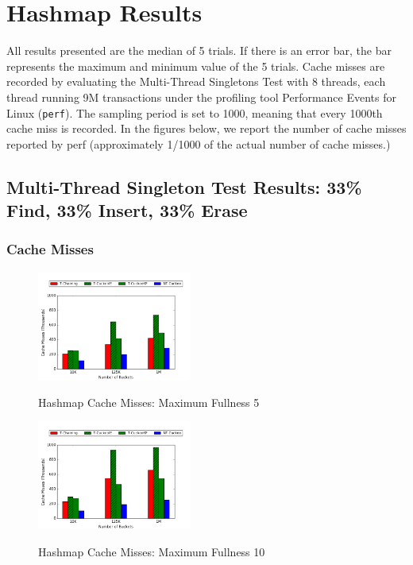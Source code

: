 \chapter{Hashmap Results}
\label{app:hashmaps}

All results presented are the median of 5 trials. If there is an error bar, the bar represents the maximum and minimum value of the 5 trials.
Cache misses are recorded by evaluating the Multi-Thread Singletons Test with 8 threads, each thread running 9M transactions under the profiling tool Performance Events for Linux (\texttt{perf}). The sampling period is set to 1000, meaning that every 1000th cache miss is recorded.
In the figures below, we report the number of cache misses reported by perf (approximately 1/1000 of the actual number of cache misses.)

\section{Multi-Thread Singleton Test Results: 33\% Find, 33\% Insert, 33\% Erase}

\subsection{Cache Misses}
\label{app:hm_cm_33}
    \begin{figure}[H]
    \centering
        {\includegraphics[width=0.45\textwidth]{maps/335cm.png}}
        \caption{Hashmap Cache Misses: Maximum Fullness 5}
    \end{figure}

    \begin{figure}[H]
    \centering
        {\includegraphics[width=0.45\textwidth]{maps/3310cm.png}}
        \caption{Hashmap Cache Misses: Maximum Fullness 10}
    \end{figure}

